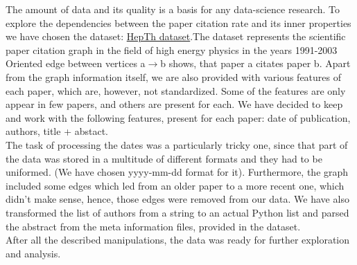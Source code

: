 \documentclass{article}
\newcommand\tab[1][1cm]{\hspace*{#1}}
\begin{document}
\tab	The amount of data and its quality is a basis for any data-science research. To explore the dependencies between the paper citation rate and its inner properties we have chosen the dataset: \href{https://www.kaggle.com/datasets/wolfram77/graphs-snap-cit}{HepTh dataset}.The dataset represents the scientific paper citation graph in the field of high energy physics in the years 1991-2003 \\
\tab	 Oriented edge between vertices a$\rightarrow$b shows, that paper a citates paper b. Apart from the graph information itself, we are also provided with various features of each paper, which are, however, not standardized. Some of the features are only appear in few papers, and others are present for each. We have decided to keep and work with the following features, present for each paper: date of publication, authors, title + abstact. \\
\tab	The task of processing the dates was a particularly tricky one, since that part of the data was stored in a multitude of different formats and they had to be uniformed. (We have chosen yyyy-mm-dd format for it). Furthermore, the graph included some edges which led from an older paper to a more recent one, which didn't make sense, hence, those edges were removed from our data. We have also transformed the list of authors from a string to an actual Python list and parsed the abstract from the meta information files, provided in the dataset. \\
\tab	After all the described manipulations, the data was ready for further exploration and analysis. \\
\end{document}
